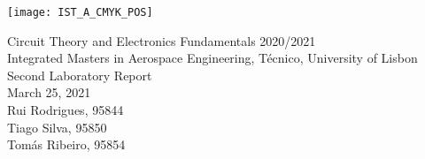 
\thispagestyle {empty}

\texttt{[image: IST\_A\_CMYK\_POS]}

\begin{center}
%
\vspace{1.0cm}

\vspace{1cm}
{\FontLb Circuit Theory and Electronics Fundamentals 2020/2021} \\ %
\vspace{1cm}
{\FontSn Integrated Masters in Aerospace Engineering, Técnico, University of Lisbon} \\ %
\vspace{1cm}
{\FontSn Second Laboratory Report} \\
\vspace{1cm}
{\FontSn March 25, 2021} \\ %
%
\vspace{1cm}
{\FontSn Rui Rodrigues, 95844 \\ Tiago Silva, 95850\\ Tomás Ribeiro, 95854}

\end{center}

